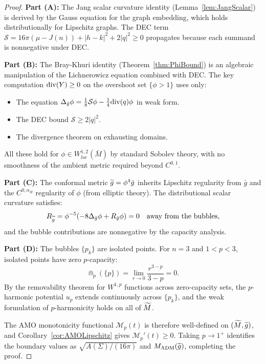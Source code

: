 \begin{proof}
\textbf{Part (A):} The Jang scalar curvature identity (Lemma~\ref{lem:JangScalar}) is derived by the Gauss equation for the graph embedding, which holds distributionally for Lipschitz graphs. The DEC term $\mathcal{S} = 16\pi(\mu - J(n)) + |h-k|^2 + 2|q|^2 \ge 0$ propagates because each summand is nonnegative under DEC.

\textbf{Part (B):} The Bray-Khuri identity (Theorem~\ref{thm:PhiBound}) is an algebraic manipulation of the Lichnerowicz equation combined with DEC. The key computation $\mathrm{div}(Y) \ge 0$ on the overshoot set $\{\phi > 1\}$ uses only:
\begin{itemize}
    \item The equation $\Delta_{\bar{g}} \phi = \frac{1}{8}\mathcal{S}\phi - \frac{1}{4}\mathrm{div}(q)\phi$ in weak form.
    \item The DEC bound $\mathcal{S} \ge 2|q|^2$.
    \item The divergence theorem on exhausting domains.
\end{itemize}
All these hold for $\phi \in W^{1,2}_{loc}(\bar{M})$ by standard Sobolev theory, with no smoothness of the ambient metric required beyond $C^{0,1}$.

\textbf{Part (C):} The conformal metric $\widetilde{g} = \phi^4 \bar{g}$ inherits Lipschitz regularity from $\bar{g}$ and the $C^{0,\alpha_H}$ regularity of $\phi$ (from elliptic theory). The distributional scalar curvature satisfies:
\begin{equation}
    R_{\widetilde{g}} = \phi^{-5}(-8\Delta_{\bar{g}}\phi + R_{\bar{g}}\phi) = 0 \quad \text{away from the bubbles},
\end{equation}
and the bubble contributions are nonnegative by the capacity analysis.

\textbf{Part (D):} The bubbles $\{p_k\}$ are isolated points. For $n = 3$ and $1 < p < 3$, isolated points have zero $p$-capacity:
\begin{equation}
    \Cap_p(\{p\}) = \lim_{r \to 0} \frac{r^{3-p}}{3-p} = 0.
\end{equation}
By the removability theorem for $W^{1,p}$ functions across zero-capacity sets, the $p$-harmonic potential $u_p$ extends continuously across $\{p_k\}$, and the weak formulation of $p$-harmonicity holds on all of $\widetilde{M}$.

The AMO monotonicity functional $\mathcal{M}_p(t)$ is therefore well-defined on $(\widetilde{M}, \widetilde{g})$, and Corollary~\ref{cor:AMOLipschitz} gives $\mathcal{M}_p'(t) \ge 0$. Taking $p \to 1^+$ identifies the boundary values as $\sqrt{A(\Sigma)/(16\pi)}$ and $M_{\mathrm{ADM}}(\widetilde{g})$, completing the proof.
\end{proof}

